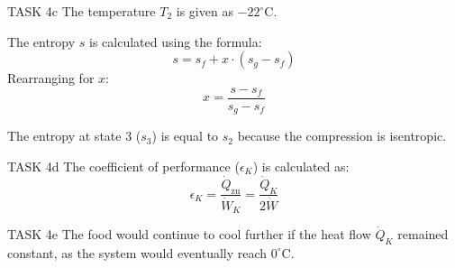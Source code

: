 TASK 4c  
The temperature \( T_2 \) is given as \( -22^\circ\text{C} \).  

The entropy \( s \) is calculated using the formula:  
\[
s = s_f + x \cdot (s_g - s_f)
\]  
Rearranging for \( x \):  
\[
x = \frac{s - s_f}{s_g - s_f}
\]  

The entropy at state 3 (\( s_3 \)) is equal to \( s_2 \) because the compression is isentropic.  

TASK 4d  
The coefficient of performance (\( \epsilon_K \)) is calculated as:  
\[
\epsilon_K = \frac{\dot{Q}_{\text{zu}}}{\dot{W}_K} = \frac{\dot{Q}_K}{2 \dot{W}}
\]  

TASK 4e  
The food would continue to cool further if the heat flow \( \dot{Q}_K \) remained constant, as the system would eventually reach \( 0^\circ\text{C} \).